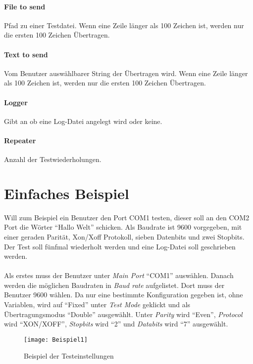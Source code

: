 \paragraph{File to send} Pfad zu einer Testdatei. Wenn eine Zeile länger als 100 Zeichen ist, werden nur die ersten 100 Zeichen Übertragen.
\paragraph{Text to send} Vom Benutzer auswählbarer String der Übertragen wird. Wenn eine Zeile länger als 100 Zeichen ist, werden nur die ersten 100 Zeichen Übertragen.
\paragraph{Logger} Gibt an ob eine Log-Datei angelegt wird oder keine.
\paragraph{Repeater} Anzahl der Testwiederholungen.


\section{Einfaches Beispiel}
\paragraph{}
Will zum Beispiel ein Benutzer den Port COM1 testen, dieser soll an den COM2 Port die Wörter "`Hallo Welt"' schicken. Als Baudrate ist 9600 vorgegeben, mit einer geraden Parität, Xon/Xoff Protokoll, sieben Datenbits und zwei Stopbits. Der Test soll fünfmal wiederholt werden und eine Log-Datei soll geschrieben werden.

\paragraph{}
Als erstes muss der Benutzer unter \textit{Main Port} "`COM1"' auswählen. Danach werden die möglichen Baudraten in \textit{Baud rate} aufgelistet. Dort muss der Benutzer 9600 wählen. Da nur eine bestimmte Konfiguration gegeben ist, ohne Variablen, wird auf "`Fixed"' unter \textit{Test Mode} geklickt und als Übertragungsmodus "`Double"' ausgewählt. Unter \textit{Parity} wird "`Even"', \textit{Protocol} wird "`XON/XOFF"', \textit{Stopbits} wird "`2"' und \textit{Databits} wird "`7"' ausgewählt.\\

\begin{figure}[h]
  \begin{center}		%
    \texttt{[image: Beispiel1]}
  		  \caption{Beispiel der Testeinstellungen}
     \label{Beispielbild 1}
  \end{center}
\end{figure}

